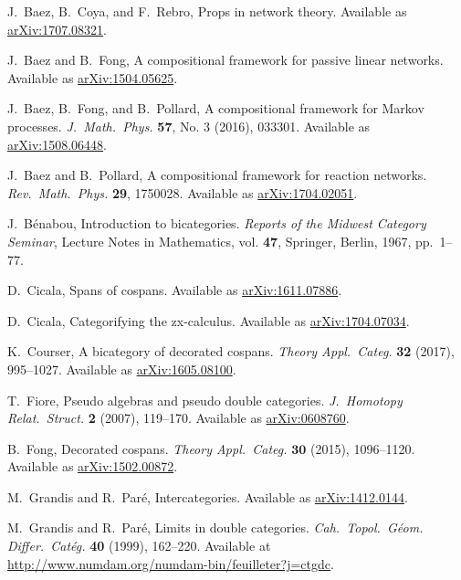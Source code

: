 \documentclass{tac}
\theoremstyle{remark}
\theoremstyle{definition}
\begin{document}
%
\begin{thebibliography}{100}

J.~Baez, B.~Coya, and F.~Rebro,
Props in network theory.
Available as \href{https://arxiv.org/abs/1707.08321}{arXiv:1707.08321}.

J.~Baez and B.~Fong,
A compositional framework for passive linear networks.
Available as \href{https://arxiv.org/abs/1504.05625}{arXiv:1504.05625}.

J.~Baez, B.~Fong, and B.~Pollard,
A compositional framework for Markov processes.
\textsl{J.\ Math.\ Phys.}  \textbf{57}, No. 3 (2016), 033301.
Available as \href{https://arxiv.org/abs/1508.06448}{arXiv:1508.06448}.

J.~Baez and B.~Pollard,
A compositional framework for reaction networks.
\textsl{Rev.\ Math.\ Phys.} \textbf{29}, 1750028.
Available as \href{https://arxiv.org/abs/1704.02051}{arXiv:1704.02051}.

J.~B\'enabou, 
Introduction to bicategories.
\emph{Reports of the Midwest Category Seminar}, 
Lecture Notes in Mathematics, vol. \textbf{47}, 
Springer, Berlin, 1967, pp.\ 1--77. 

D.~Cicala, 
Spans of cospans.
Available as \href{https://arxiv.org/abs/1611.07886}{arXiv:1611.07886}.

D.~Cicala, 
Categorifying the zx-calculus.
Available as \href{https://arxiv.org/abs/1704.07034}{arXiv:1704.07034}.

K.~Courser, 
A bicategory of decorated cospans.
\textsl{Theory Appl.\ Categ.} \textbf{32} (2017), 995--1027.
Available as \href{https://arxiv.org/pdf/1605.08100v2.pdf}{arXiv:1605.08100}.

T.~Fiore, 
Pseudo algebras and pseudo double categories.
\textsl{J.\ Homotopy Relat.\ Struct.} \textbf{2} 
(2007), 119--170. 
Available as \href{http://arxiv.org/abs/math/0608760}{arXiv:0608760}.

B.\ Fong, 
Decorated cospans.
\textsl{Theory Appl.\ Categ.}
$\mathbf{30}$ (2015), 1096--1120. 
Available as \href{http://arxiv.org/abs/1502.00872}{arXiv:1502.00872}.

M.~Grandis and R.~Par\'{e}, 
Intercategories.
Available as \href{https://arxiv.org/abs/1412.0144}{arXiv:1412.0144}.

M.~Grandis and R.~Par\'{e}, 
Limits in double categories.
\textsl{Cah.\ Topol.\ G\'{e}om. Differ.\ Cat\'{e}g.}
\textbf{40}  
(1999), 162--220. 
Available at \href{http://www.numdam.org/numdam-bin/feuilleter?j=ctgdc}{http://www.numdam.org/numdam-bin/feuilleter?j=ctgdc}.


\end{thebibliography}
\end{document}
